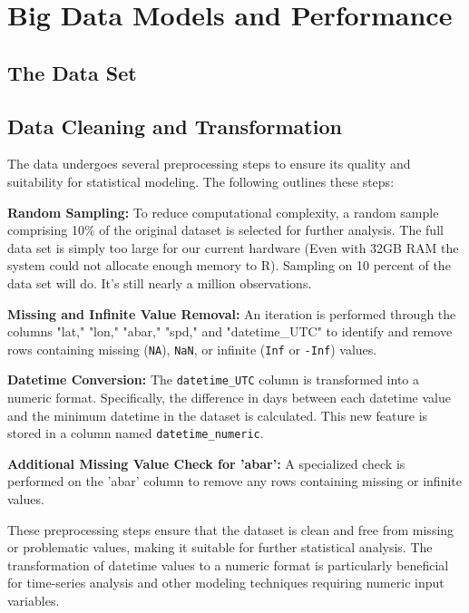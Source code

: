 


\section{Big Data Models and Performance}


\subsection{The Data Set}



\subsection{Data Cleaning and Transformation}
The data undergoes several preprocessing steps to ensure its quality and suitability for statistical modeling. The following outlines these steps:
\newline
    
\textbf{Random Sampling:} To reduce computational complexity, a random sample comprising 10\% of the original dataset is selected for further analysis. The full data set is simply too large for our current hardware (Even with 32GB RAM the system could not allocate enough memory to R). Sampling on 10 percent of the data set will do. It's still nearly a million observations. 
\newline

\textbf{Missing and Infinite Value Removal:} An iteration is performed through the columns "lat," "lon," "abar," "spd," and "datetime\_UTC" to identify and remove rows containing missing (\texttt{NA}), \texttt{NaN}, or infinite (\texttt{Inf} or \texttt{-Inf}) values.
\newline

\textbf{Datetime Conversion:} The \texttt{datetime\_UTC} column is transformed into a numeric format. Specifically, the difference in days between each datetime value and the minimum datetime in the dataset is calculated. This new feature is stored in a column named \texttt{datetime\_numeric}.
\newline

\textbf{Additional Missing Value Check for 'abar':} A specialized check is performed on the 'abar' column to remove any rows containing missing or infinite values.
\newline

These preprocessing steps ensure that the dataset is clean and free from missing or problematic values, making it suitable for further statistical analysis. The transformation of datetime values to a numeric format is particularly beneficial for time-series analysis and other modeling techniques requiring numeric input variables.



